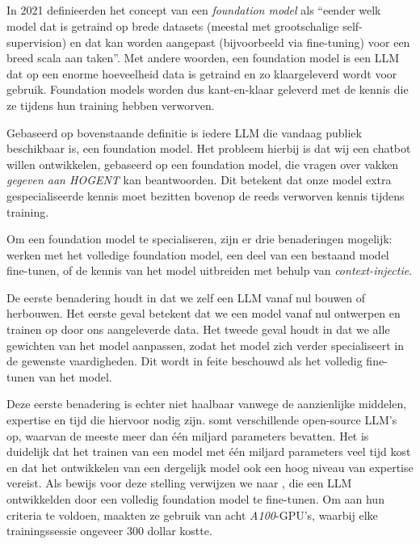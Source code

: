 \subsection{}%
\label{subsec:specialiseren_llm}

In 2021 definieerden \textcite{Bommasani2021} het concept van een \emph{foundation model} als ``eender welk model dat is getraind op brede datasets (meestal met grootschalige self-supervision) en dat kan worden aangepast (bijvoorbeeld via fine-tuning) voor een breed scala aan taken''. Met andere woorden, een foundation model is een \acrshort{LLM} dat op een enorme hoeveelheid data is getraind en zo klaargeleverd wordt voor gebruik. Foundation models worden dus kant-en-klaar geleverd met de kennis die ze tijdens hun training hebben verworven.

Gebaseerd op bovenstaande definitie is iedere \acrshort{LLM} die vandaag publiek beschikbaar is, een foundation model. Het probleem hierbij is dat wij een chatbot willen ontwikkelen, gebaseerd op een foundation model, die vragen over vakken \emph{gegeven aan HOGENT} kan beantwoorden. Dit betekent dat onze model extra gespecialiseerde kennis moet bezitten bovenop de reeds verworven kennis tijdens training.

Om een foundation model te specialiseren, zijn er drie benaderingen mogelijk: werken met het volledige foundation model, een deel van een bestaand model fine-tunen, of de kennis van het model uitbreiden met behulp van \emph{context-injectie}.

De eerste benadering houdt in dat we zelf een \acrshort{LLM} vanaf nul bouwen of herbouwen. Het eerste geval betekent dat we een model vanaf nul ontwerpen en trainen op door ons aangeleverde data. Het tweede geval houdt in dat we alle gewichten van het model aanpassen, zodat het model zich verder specialiseert in de gewenste vaardigheden. Dit wordt in feite beschouwd als het volledig fine-tunen van het model.

Deze eerste benadering is echter niet haalbaar vanwege de aanzienlijke middelen, expertise \autocite{Naveed2023} en tijd die hiervoor nodig zijn. \textcite{Fourrier2024} somt verschillende open-source \acrshort{LLM}'s op, waarvan de meeste meer dan één miljard parameters bevatten. Het is duidelijk dat het trainen van een model met één miljard parameters veel tijd kost en dat het ontwikkelen van een dergelijk model ook een hoog niveau van expertise vereist. Als bewijs voor deze stelling verwijzen we naar \textcite{Chiang2023}, die een \acrshort{LLM} ontwikkelden door een volledig foundation model te fine-tunen. Om aan hun criteria te voldoen, maakten ze gebruik van acht \emph{A100}-GPU’s, waarbij elke trainingssessie ongeveer 300 dollar kostte.

